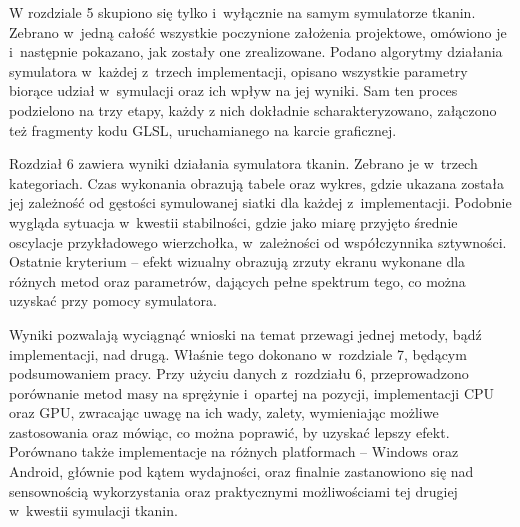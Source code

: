 	W rozdziale 5 skupiono się tylko i~wyłącznie na samym symulatorze tkanin. Zebrano w~jedną całość wszystkie poczynione założenia projektowe, omówiono je i~następnie pokazano, jak zostały one zrealizowane. Podano algorytmy działania symulatora w~każdej z~trzech implementacji, opisano wszystkie parametry biorące udział w~symulacji oraz ich wpływ na jej wyniki. Sam ten proces podzielono na trzy etapy, każdy z nich dokładnie scharakteryzowano, załączono też fragmenty kodu GLSL, uruchamianego na karcie graficznej.
	
	Rozdział 6 zawiera wyniki działania symulatora tkanin. Zebrano je w~trzech kategoriach. Czas wykonania obrazują tabele oraz wykres, gdzie ukazana została jej zależność od gęstości symulowanej siatki dla każdej z~implementacji. Podobnie wygląda sytuacja w~kwestii stabilności, gdzie jako miarę przyjęto średnie oscylacje przykładowego wierzchołka, w~zależności od współczynnika sztywności. Ostatnie kryterium -- efekt wizualny obrazują zrzuty ekranu wykonane dla różnych metod oraz parametrów, dających pełne spektrum tego, co można uzyskać przy pomocy symulatora. 
	
	Wyniki pozwalają wyciągnąć wnioski na temat przewagi jednej metody, bądź implementacji, nad drugą. Właśnie tego dokonano w~rozdziale 7, będącym podsumowaniem pracy. Przy użyciu danych z~rozdziału 6, przeprowadzono porównanie metod masy na sprężynie i~opartej na pozycji, implementacji CPU oraz GPU, zwracając uwagę na ich wady, zalety, wymieniając możliwe zastosowania oraz mówiąc, co można poprawić, by uzyskać lepszy efekt. Porównano także implementacje na różnych platformach -- Windows oraz Android, głównie pod kątem wydajności, oraz finalnie zastanowiono się nad sensownością wykorzystania oraz praktycznymi możliwościami tej drugiej w~kwestii symulacji tkanin.